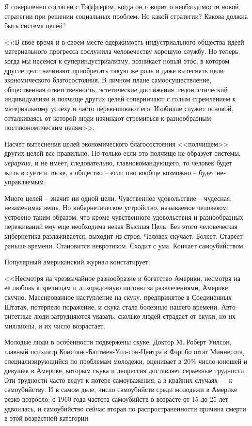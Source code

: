 \documentclass{book}
\begin{document}
Я совершенно согласен с Тоффлером, когда он говорит о необходимости новой стратегии при решении социальных проб­лем. Но какой стратегии? Какова должна быть система целей?

<<В свое время и в своем месте одержимость индустриально­го общества идеей материального прогресса сослужила челове­честву хорошую службу. Но теперь, когда мы несемся к супер­индустриализму, возникает новый этос, в котором другие це­ли начинают приобретать такую же роль и даже вытеснять це­ли экономического благосостояния. В личном плане самоосу­ществление, общественная ответственность, эстетические дости­жения, гедонистический индивидуализм и полчище других це­лей соперничают с голым стремлением к материальному успе­ху и часто перевешивают его. Изобилие служит основой, оттал­киваясь от которой люди начинают стремиться к разнообраз­ным постэкономическим целям>>.%

Насчет вытеснения целей экономического благосостояния <<полчищем>> других целей все правильно. Но только если это полчище не образует системы, \textit{иерархии,}  и не имеет, следовательно, главнокомандующего, то человек будет жить в суете и тоске, а общество -- если оно вообще возможно -- будет не­управляемым.

Много целей -- значит ни одной цели. Чувственное удовольст­вие -- чудесная, незаменимая вещь. Но кибернетическое устрой­ство, называемое человеком, устроено таким образом, что кро­ме чувственного удовольствия и разнообразных переживаний ему еще необходима некая Высшая Цель. Без этого человече­ская кибернетика разлаживается, выходит из строя. Человек ску­чает. Болеет. Стареет раньше времени. Становится невротиком. Сходит с ума. Кончает самоубийством.

Популярный американский журнал констатирует:

<<Несмотря на чрезвычайное разнообразие и богатство Аме­рики, несмотря на ее любовь к зрелищам и лихорадочную пого­ню за развлечениями, Америке скучно. Массированное насту­пление на скуку, предпринятое в Соединенных Штатах, потер­пело поражение, и скука стала болезнью нашего времени. Авто­ритетные люди затрудняются указать, сколько людей страдает от скуки, но их миллионы, и их число возрастает.

Молодые люди в особенности подвержены скуке. Доктор М. Роберт Уилсон, главный психиатр Констанс-Балтмен-Уил-сон-Центра в Фэрибо штат Миннесота, специализирующийся по проблемам молодежи, оценивает в $20\%$ число юношей и де­вушек в Америке, которым скука и депрессия доставляет се­рьезные трудности. Эти трудности часто ведут к потере самоува­жения, а в крайних случаях --  к самоубийству. И в самом деле, число самоубийств среди молодежи в Америке резко возрос­ло: с 1960 года частота самоубийств в возрасте от 15 до 25 лет удвоилась, и самоубийство сейчас вторая по распространенно­сти причина смерти в этой возрастной категории.
\end{document}
